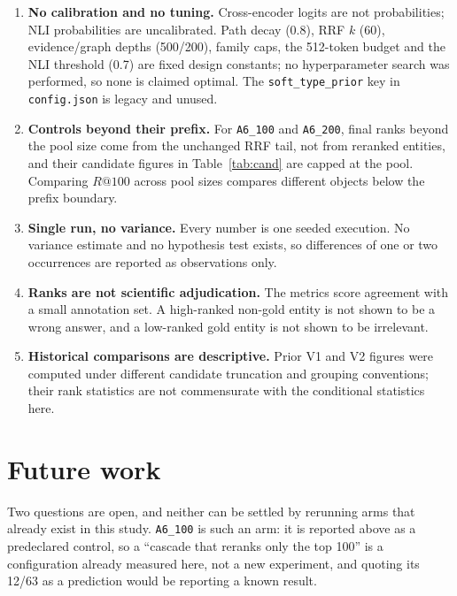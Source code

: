\documentclass[11pt,a4paper]{article}
\begin{document}
\begin{enumerate}
\item \textbf{No calibration and no tuning.} Cross-encoder logits are not probabilities; NLI probabilities
are uncalibrated. Path decay (0.8), RRF $k$ (60), evidence/graph depths (500/200), family caps, the 512-token
budget and the NLI threshold (0.7) are fixed design constants; no hyperparameter search was performed, so
none is claimed optimal. The \texttt{soft\_type\_prior} key in \texttt{config.json} is legacy and unused.

\item \textbf{Controls beyond their prefix.} For \texttt{A6\_100} and \texttt{A6\_200}, final ranks beyond
the pool size come from the unchanged RRF tail, not from reranked entities, and their candidate figures in
Table~\ref{tab:cand} are capped at the pool. Comparing $R@100$ across pool sizes compares different objects
below the prefix boundary.

\item \textbf{Single run, no variance.} Every number is one seeded execution. No variance estimate and no
hypothesis test exists, so differences of one or two occurrences are reported as observations only.

\item \textbf{Ranks are not scientific adjudication.} The metrics score agreement with a small annotation
set. A high-ranked non-gold entity is not shown to be a wrong answer, and a low-ranked gold entity is not
shown to be irrelevant.

\item \textbf{Historical comparisons are descriptive.} Prior V1 and V2 figures were computed under different
candidate truncation and grouping conventions; their rank statistics are not commensurate with the
conditional statistics here.
\end{enumerate}

\section{Future work}

Two questions are open, and neither can be settled by rerunning arms that already exist in this study.
\texttt{A6\_100} is such an arm: it is reported above as a predeclared control, so a ``cascade that reranks
only the top 100'' is a configuration already measured here, not a new experiment, and quoting its 12/63 as
a prediction would be reporting a known result.
\end{document}
